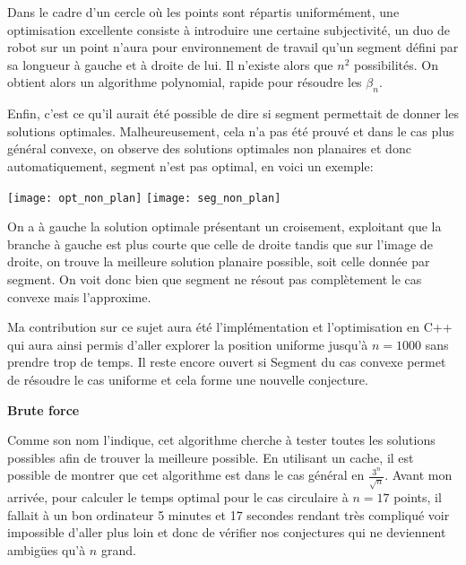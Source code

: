 Dans le cadre d'un cercle où les points sont répartis uniformément, une optimisation excellente consiste à introduire une certaine subjectivité, un duo de robot sur un point n'aura pour environnement de travail qu'un segment défini par sa longueur à gauche et à droite de lui. Il n'existe alors que $n^2$ possibilités. On obtient alors un algorithme polynomial, rapide pour résoudre les $\beta_n$. 

Enfin, c'est ce qu'il aurait été possible de dire si segment permettait de donner les solutions optimales. Malheureusement, cela n'a pas été prouvé et dans le cas plus général convexe, on observe des solutions optimales non planaires et donc automatiquement, segment n'est pas optimal, en voici un exemple:

\texttt{[image: opt\_non\_plan]}
\texttt{[image: seg\_non\_plan]}

On a à gauche la solution optimale présentant un croisement, exploitant que la branche à gauche est plus courte que celle de droite tandis que sur l'image de droite, on trouve la meilleure solution planaire possible, soit celle donnée par segment. On voit donc bien que segment ne résout pas complètement le cas convexe mais l'approxime.

Ma contribution sur ce sujet aura été l'implémentation et l'optimisation en C++ qui aura ainsi permis d'aller explorer la position uniforme jusqu'à $n = 1000$ sans prendre trop de temps. Il reste encore ouvert si Segment du cas convexe permet de résoudre le cas uniforme et cela forme une nouvelle conjecture.

\textbf{\Large{Brute force}}

Comme son nom l'indique, cet algorithme cherche à tester toutes les solutions possibles afin de trouver la meilleure possible. En utilisant un cache, il est possible de montrer que cet algorithme est dans le cas général en $\frac{3^n}{\sqrt{n}}$. Avant mon arrivée, pour calculer le temps optimal pour le cas circulaire à $n = 17$ points, il fallait à un bon ordinateur 5 minutes et 17 secondes rendant très compliqué voir impossible d'aller plus loin et donc de vérifier nos conjectures qui ne deviennent ambigües qu'à $n$ grand.

